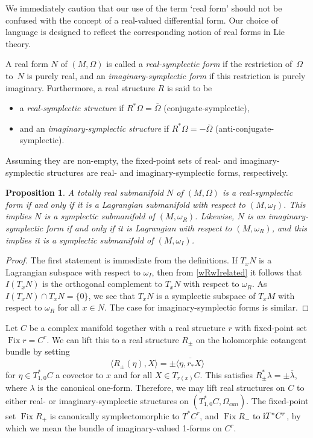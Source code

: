 \documentclass[pdftex]{sigma}
\numberwithin{equation}{section}
\newtheorem{Proposition}[Theorem]{Proposition}
 { \theoremstyle{definition}
\newtheorem{Definition}[Theorem]{Definition}
\newtheorem{Note}[Theorem]{Note}
\newtheorem{Example}[Theorem]{Example}
\newtheorem{Remark}[Theorem]{Remark} }
\DeclareMathOperator{\fix}{Fix}
\begin{document}
We immediately caution that our use of the term `real form' should not be confused with the concept of a real-valued differential form. Our choice of language is designed to reflect the corresponding notion of real forms in Lie theory.

\begin{Definition}\label{first_defn}
	A real form $N$ of $(M,\Omega)$ is called a \emph{real-symplectic form} if the restriction of~$\Omega$ to~$N$ is purely real, and an \emph{imaginary-symplectic form} if this restriction is purely imaginary. Furthermore, a real structure $R$ is said to be
	\begin{itemize}\itemsep=0pt
		\item a \emph{real-symplectic structure} if $R^*\Omega=\overline{\Omega}$ (conjugate-symplectic),
		\item and an \emph{imaginary-symplectic structure} if $R^*\Omega=-\overline{\Omega}$ (anti-conjugate-symplectic).
	\end{itemize}
\end{Definition}
Assuming they are non-empty, the fixed-point sets of real- and imaginary-symplectic structures are real- and imaginary-symplectic forms, respectively.
\begin{Proposition}\label{symp_Lang}
	A totally real submanifold $N$ of $(M,\Omega)$ is a real-symplectic form if and only if it is a Lagrangian submanifold with respect to $(M,\omega_I)$. This implies $N$ is a symplectic sub\-manifold of $(M,\omega_R)$. Likewise, $N$ is an imaginary-symplectic form if and only if it is Lagrangian with respect to $(M,\omega_R)$, and this implies it is a symplectic submanifold of $(M,\omega_I)$.
\end{Proposition}
\begin{proof}
	The first statement is immediate from the definitions. If $T_xN$ is a Lagrangian subspace with respect to $\omega_I$, then from \eqref{wRwIrelated} it follows that $I(T_xN)$ is the orthogonal complement to $T_xN$ with respect to $\omega_R$. As $I(T_xN)\cap T_xN=\{0\}$, we see that $T_xN$ is a symplectic subspace of $T_xM$ with respect to $\omega_R$ for all $x\in N$. The case for imaginary-symplectic forms is similar.
\end{proof}

\begin{Example}%
	Let $C$ be a complex manifold together with a real structure $r$ with fixed-point set $\fix r=C^r$. We can lift this to a real structure $R_\pm$ on the holomorphic cotangent bundle by setting
	\[
	\langle R_\pm(\eta),X\rangle=\pm\overline{\langle \eta,r_*X\rangle}
	\]
	for $\eta\in T^*_{1,0}C$ a covector to $x$ and for all $X\in T_{r(x)}C$. This satisfies $R_\pm^*\lambda=\pm\overline{\lambda}$, where $\lambda$ is the canonical one-form. Therefore, we may lift real structures on $C$ to either real- or imaginary-symplectic structures on $(T^*_{1,0}C,\Omega_{can})$. The fixed-point set $\fix R_+$ is canonically symplectomorphic to $T^*C^r$, and $\fix R_-$ to ${\rm i}T^*C^r$, by which we mean the bundle of imaginary-valued 1-forms on $C^r$.
\end{Example}
\end{document}
